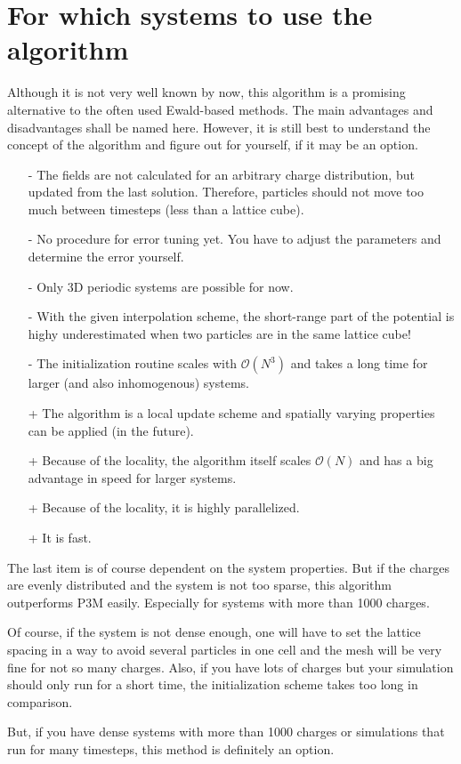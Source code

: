 \section{For which systems to use the algorithm}

Although it is not very well known by now, this algorithm is a
promising alternative to the often used Ewald-based methods. The main
advantages and disadvantages shall be named here. However, it is still
best to understand the concept of the algorithm and figure out for
yourself, if it may be an option.

\begin{itemize}
\item[-] The fields are not calculated for an arbitrary charge
  distribution, but updated from the last solution. Therefore,
  particles should not move too much between timesteps (less than a
  lattice cube).
\item[-] No procedure for error tuning yet. You have to adjust the
  parameters and determine the error yourself.
\item[-] Only 3D periodic systems are possible for now.
\item[-] With the given interpolation scheme, the short-range part of
  the potential is highy underestimated when two particles are in the
  same lattice cube!
\item[-] The initialization routine scales with $\mathcal{O}(N^3)$ and
  takes a long time for larger (and also inhomogenous) systems.
\item[+] The algorithm is a local update scheme and spatially varying
  properties can be applied (in the future).
\item[+] Because of the locality, the algorithm itself scales
  $\mathcal{O}(N)$ and has a big advantage in speed for larger
  systems.
\item[+] Because of the locality, it is highly parallelized.
\item[+] It is fast.
\end{itemize}

The last item is of course dependent on the system properties. But if
the charges are evenly distributed and the system is not too sparse,
this algorithm outperforms P3M easily. Especially for systems with
more than 1000 charges.

Of course, if the system is not dense enough, one will have to set the
lattice spacing in a way to avoid several particles in one cell and
the mesh will be very fine for not so many charges. Also, if you have
lots of charges but your simulation should only run for a short time,
the initialization scheme takes too long in comparison.

But, if you have dense systems with more than 1000 charges or
simulations that run for many timesteps, this method is definitely an
option.
